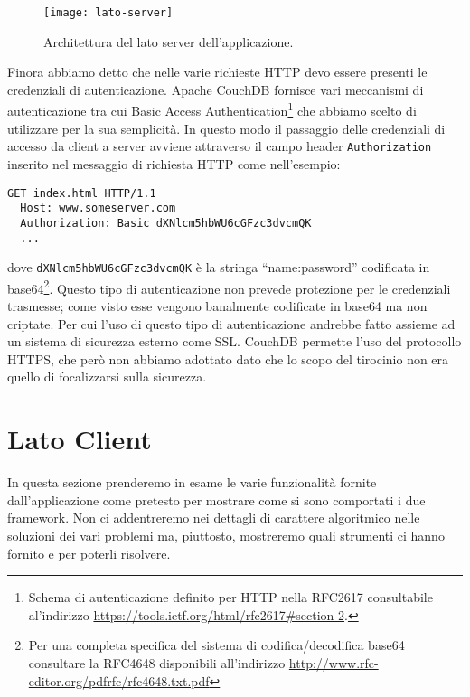         \begin{figure}[h]
            \centering
            \texttt{[image: lato-server]}
            \caption{
                Architettura del lato server dell'applicazione.
            }
            \label{fig:latoserver}
        \end{figure}

        Finora abbiamo detto che nelle varie richieste HTTP devo essere presenti
        le credenziali di autenticazione. Apache CouchDB\texttrademark{} fornisce
        vari meccanismi di autenticazione tra cui Basic Access Authentication\footnote{
        Schema di autenticazione definito per HTTP nella RFC2617 consultabile al'indirizzo
        \url{https://tools.ietf.org/html/rfc2617\#section-2}.}
        che abbiamo scelto di utilizzare per la sua semplicità. In questo modo il
        passaggio delle credenziali di accesso da client a server avviene attraverso
        il campo header \texttt{Authorization} inserito nel messaggio di richiesta HTTP
        come nell'esempio:
        \begin{lstlisting}[language=http]
  GET index.html HTTP/1.1
  Host: www.someserver.com
  Authorization: Basic dXNlcm5hbWU6cGFzc3dvcmQK
  ...
        \end{lstlisting}
        dove \texttt{dXNlcm5hbWU6cGFzc3dvcmQK} è la stringa ``name:password''
        codificata in base64\footnote{Per una completa specifica del sistema di
        codifica/decodifica base64 consultare la RFC4648 disponibili all'indirizzo
        \url{http://www.rfc-editor.org/pdfrfc/rfc4648.txt.pdf}}.
        Questo tipo di autenticazione non prevede protezione per le credenziali
        trasmesse; come visto esse vengono banalmente codificate in base64 ma non
        criptate. Per cui l'uso di questo tipo di
        autenticazione andrebbe fatto assieme ad un sistema di sicurezza esterno
        come SSL\citep{Web:RFC2617}. CouchDB permette l'uso del protocollo HTTPS,
        che però non abbiamo adottato dato che lo scopo del tirocinio non era quello di focalizzarsi
        sulla sicurezza.


    \section{Lato Client}
        In questa sezione prenderemo in esame le varie funzionalità fornite
        dall'applicazione come pretesto per mostrare come si sono
        comportati i due framework. Non ci addentreremo
        nei dettagli di carattere algoritmico nelle soluzioni dei vari problemi ma,
        piuttosto, mostreremo quali strumenti ci hanno fornito \tisdk{} e \pg{}
        per poterli risolvere.

